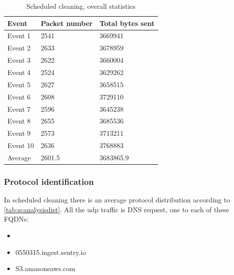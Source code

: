 \begin{table}[H]
\centering
\caption{Scheduled cleaning, overall statistics}
\label{tab:scoverall}
\begin{tabular}{|l|l|l|}
\hline
\textbf{Event} & \textbf{Packet number} & \textbf{Total bytes sent} \\ \hline
Event 1        & 2541                   & 3669941                   \\ \hline
Event 2        & 2633                   & 3678959                   \\ \hline
Event 3        & 2622                   & 3660004                   \\ \hline
Event 4        & 2524                   & 3629262                   \\ \hline
Event 5        & 2627                   & 3658515                   \\ \hline
Event 6        & 2608                   & 3729110                   \\ \hline
Event 7        & 2596                   & 3645238                   \\ \hline
Event 8        & 2655                   & 3685536                   \\ \hline
Event 9        & 2573                   & 3713211                   \\ \hline
Event 10       & 2636                   & 3768883                   \\ \hline
Average        & 2601.5                 & 3683865.9                 \\ \hline
\end{tabular}
\end{table}


\subsubsection{Protocol identification}
In scheduled cleaning there is an average protocol distribution according to \ref{tab:scanalysisdist}. All the udp traffic is DNS request, one to each of these FQDNs:

\begin{itemize}
    \item \item 0550315.ingest.sentry.io
    \item S3.amasoneaws.com
\end{itemize}

